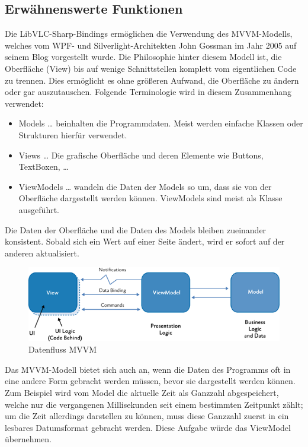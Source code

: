 \subsection{Erwähnenswerte Funktionen}
Die LibVLC-Sharp-Bindings ermöglichen die Verwendung des MVVM-Modells, welches vom WPF- und Silverlight-Architekten John Gossman im Jahr 2005 auf seinem Blog vorgestellt wurde. \cite[vlg.][The Evolution of Model-View-ViewModel]{msdoc-mvvm}
Die Philosophie hinter diesem Modell ist, die Oberfläche (View) bis auf wenige Schnittstellen komplett vom eigentlichen Code zu trennen.
Dies ermöglicht es ohne größeren Aufwand, die Oberfläche zu ändern oder gar auszutauschen.
Folgende Terminologie wird in diesem Zusammenhang verwendet:
\begin{itemize}
\item Models … beinhalten die Programmdaten. Meist werden einfache Klassen oder Strukturen hierfür verwendet.
\item Views … Die grafische Oberfläche und deren Elemente wie Buttons, TextBoxen, …
\item ViewModels … wandeln die Daten der Models so um, dass sie von der Oberfläche dargestellt werden können. ViewModels sind meist als Klasse ausgeführt.
\end{itemize}

Die Daten der Oberfläche und die Daten des Models bleiben zueinander konsistent. Sobald sich ein Wert auf einer Seite ändert, wird er sofort auf der anderen aktualisiert.
\begin{figure}[H]
    \centering
    \includegraphics[width=.9\linewidth]{images/software_module/MVVM.png}
    \caption{Datenfluss MVVM}
\end{figure}
Das MVVM-Modell bietet sich auch an, wenn die Daten des Programms oft in eine andere Form gebracht werden müssen, bevor sie dargestellt werden können. Zum Beispiel wird vom Model die aktuelle Zeit als Ganzzahl abgespeichert, welche nur die vergangenen Millisekunden seit einem bestimmten Zeitpunkt zählt; um die Zeit allerdings darstellen zu können, muss diese Ganzzahl zuerst in ein lesbares Datumsformat gebracht werden. Diese Aufgabe würde das ViewModel übernehmen.

